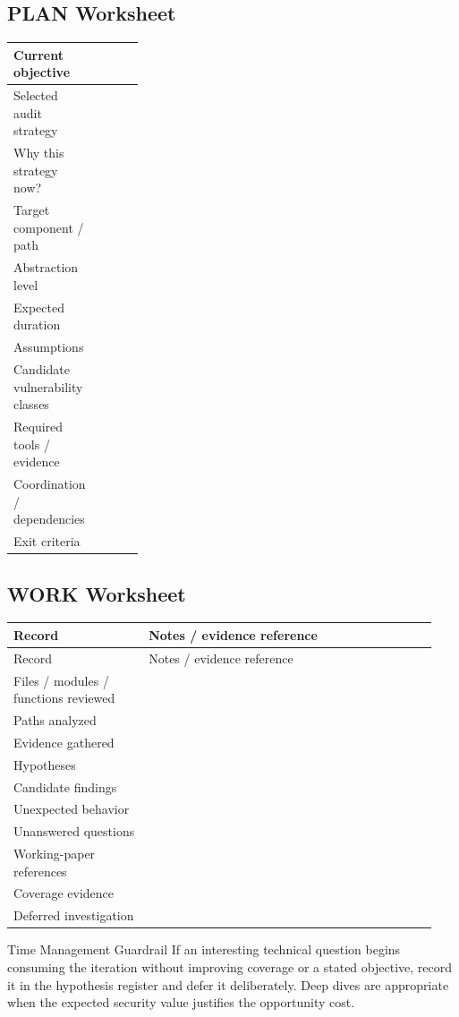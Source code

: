 \documentclass[10pt]{article}
\begin{document}
\subsection{PLAN Worksheet}
\par\smallskip\noindent\begin{tabularx}{\linewidth}{@{}L{0.29\linewidth}Y@{}}
Current objective & \\ \midrule
Selected audit strategy & \\ \midrule
Why this strategy now? & \\ \midrule
Target component / path & \\ \midrule
Abstraction level & \\ \midrule
Expected duration & \\ \midrule
Assumptions & \\ \midrule
Candidate vulnerability classes & \\ \midrule
Required tools / evidence & \\ \midrule
Coordination / dependencies & \\ \midrule
Exit criteria & \\ 
\end{tabularx}

\subsection{WORK Worksheet}
\begin{longtable}{@{}L{0.30\linewidth}L{0.64\linewidth}@{}}
\toprule
Record & Notes / evidence reference \\
\midrule
\endfirsthead
\toprule
Record & Notes / evidence reference \\
\midrule
\endhead
Files / modules / functions reviewed & \\
Paths analyzed & \\
Evidence gathered & \\
Hypotheses & \\
Candidate findings & \\
Unexpected behavior & \\
Unanswered questions & \\
Working-paper references & \\
Coverage evidence & \\
Deferred investigation & \\
\bottomrule
\end{longtable}

\begin{cautionbox}{Time Management Guardrail}
If an interesting technical question begins consuming the iteration without improving coverage or a stated objective, record it in the hypothesis register and defer it deliberately. Deep dives are appropriate when the expected security value justifies the opportunity cost.
\end{cautionbox}
\clearpage
\end{document}
